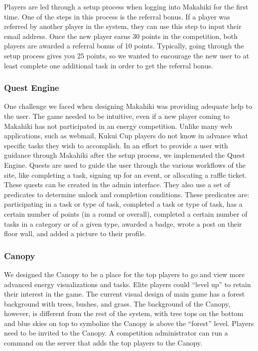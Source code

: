 \documentclass{acm_proc_article-sp}
\begin{document}
Players are led through a setup process when logging into Makahiki for the first time. One of the steps in this process is the referral bonus. If a player was referred by another player in the system, they can use this step to input their email address. Once the new player earns 30 points in the competition, both players are awarded a referral bonus of 10 points. Typically, going through the setup process gives you 25 points, so we wanted to encourage the new user to at least complete one additional task in order to get the referral bonus.

\subsubsection{Quest Engine}

One challenge we faced when designing Makahiki was providing adequate help to the user. The game needed to be intuitive, even if a new player coming to Makahiki has not participated in an energy competition. Unlike many web applications, such as webmail, Kukui Cup players do not know in advance what specific tasks they wish to accomplish. In an effort to provide a user with guidance through Makahiki after the setup process, we implemented the Quest Engine. Quests are used to guide the user through the various workflows of the site, like completing a task, signing up for an event, or allocating a raffle ticket. These quests can be created in the admin interface. They also use a set of predicates to determine unlock and completion conditions. These predicates are: participating in a task or type of task, completed a task or type of task, has a certain number of points (in a round or overall), completed a certain number of tasks in a category or of a given type, awarded a badge, wrote a post on their floor wall, and added a picture to their profile.

\subsubsection{Canopy}

We designed the Canopy to be a place for the top players to go and view more advanced energy visualizations and tasks. Elite players could ``level up'' to retain their interest in the game. The current visual design of main game has a forest background with trees, bushes, and grass. The background of the Canopy, however, is different from the rest of the system, with tree tops on the bottom and blue skies on top to symbolize the Canopy is above the ``forest'' level. Players need to be invited to the Canopy. A competition administrator can run a command on the server that adds the top players to the Canopy.
\end{document}
